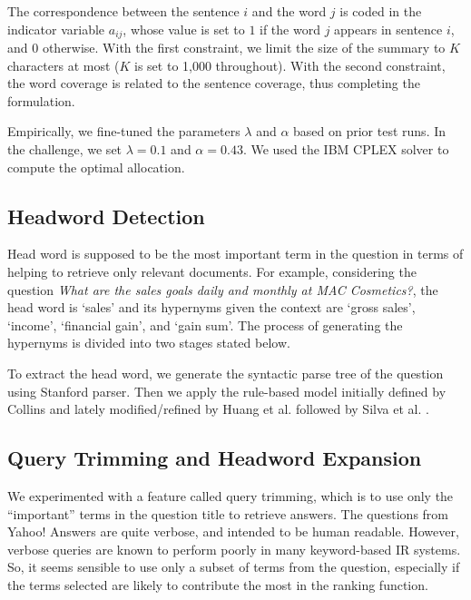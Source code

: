 \documentclass[a4paper,10pt,conference,compsocconf,final]{IEEEtran}
\begin{document}
{{{{The correspondence between the sentence $i$ and the word $j$ is coded in the
indicator variable $a_{ij}$, whose value is set to $1$ if the word $j$ appears
in sentence $i$, and $0$ otherwise.  With the first constraint, we limit the
size of the summary to $K$ characters at most ($K$ is set to 1,000 throughout).
With the second constraint, the word coverage is related to the sentence
coverage, thus completing the formulation.

Empirically, we fine-tuned the parameters $\lambda$ and $\alpha$ based on prior
test runs.  In the challenge, we set $\lambda = 0.1$ and $\alpha = 0.43$.  We
used the IBM CPLEX solver to compute the optimal allocation.




\subsection{Headword Detection}
\label{sec:head}

Head word is supposed to be the most important term in the question in terms of
helping to retrieve only relevant documents. For example, considering the
question \textit{What are the sales goals daily and monthly at MAC Cosmetics?},
the head word is `sales' and its hypernyms given the context are `gross sales',
`income', `financial gain', and `gain sum'. The process of generating the
hypernyms is divided into two stages stated below.

To extract the head word, we generate the syntactic parse tree of the question
using Stanford parser. Then we apply the rule-based model initially defined by
Collins \cite{collins2003head} and lately modified/refined by Huang et al.
\cite{huang2008question} followed by Silva et al. \cite{silva2011symbolic}.



\subsection{Query Trimming and Headword Expansion}
\label{sec:redexp}

We experimented with a feature called query trimming, which is to use
only the ``important'' terms in the question title to retrieve
answers.
The questions from Yahoo! Answers are quite verbose, and intended 
to be human readable.
However, verbose queries are known to perform poorly in many keyword-based
IR systems.
So, it seems sensible to use only a subset of terms from the question,
especially if the terms selected are likely to contribute the most in the
ranking function.

}}}}
\end{document}
